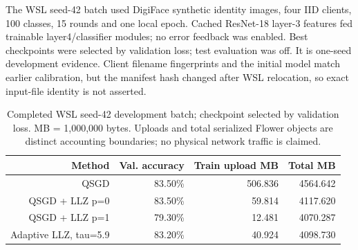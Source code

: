 The WSL seed-42 batch used DigiFace synthetic identity images, four IID clients, 100 classes, 15 rounds and one local epoch. Cached ResNet-18 layer-3 features fed trainable layer4/classifier modules; no error feedback was enabled. Best checkpoints were selected by validation loss; test evaluation was off. It is one-seed development evidence. Client filename fingerprints and the initial model match earlier calibration, but the manifest hash changed after WSL relocation, so exact input-file identity is not asserted. \parencite{bae2023digiface}

\begin{table}[htbp]
\centering
\small
\begin{tabularx}{\textwidth}{R{1.60000}R{0.72000}R{0.88000}R{0.80000}}
\toprule
\textbf{Method} & \textbf{Val. accuracy} & \textbf{Train upload MB} & \textbf{Total MB} \\\midrule
QSGD & 83.50\% & 506.836 & 4564.642 \\
QSGD + LLZ p=0 & 83.50\% & 59.814 & 4117.620 \\
QSGD + LLZ p=1 & 79.30\% & 12.481 & 4070.287 \\
Adaptive LLZ, tau=5.9 & 83.20\% & 40.924 & 4098.730 \\
\bottomrule
\end{tabularx}
\caption{Completed WSL seed-42 development batch; checkpoint selected by validation loss. MB = 1,000,000 bytes. Uploads and total serialized Flower objects are distinct accounting boundaries; no physical network traffic is claimed.}
\label{tab:pilot}
\end{table}

